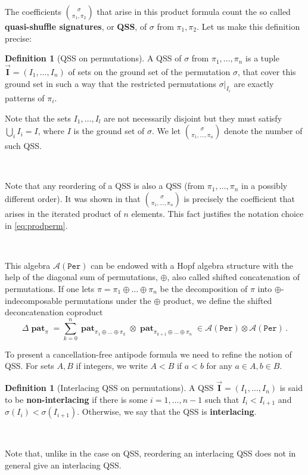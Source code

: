 \documentclass[12pt, reqno]{amsart}
\theoremstyle{definition}
\newtheorem{defin}[thm]{Definition}
\newcommand{\III}{\vec{\mathbf{I}}}
\DeclareMathOperator{\pat}{\mathbf{pat}}
\begin{document}
The coefficients $\binom{\sigma}{\pi_1, \pi_2}$ that arise in this product formula count the so called \textbf{quasi-shuffle signatures}, or \textbf{QSS}, of $\sigma$ from $\pi_1, \pi_2$.
Let us make this definition precise:

\begin{defin}[QSS on permutations]
A QSS of $\sigma$ from $\pi_1, \dots, \pi_n$ is a tuple $\III = (I_1, \dots, I_n)$ of sets on the ground set of the permutation $\sigma$, that cover this ground set in such a way that the restricted permutations $\sigma|_{I_i}$ are exactly patterns of $\pi_i$.

Note that the sets $I_1, \ldots, I_l$ are not necessarily disjoint but they must satisfy $\bigcup_i I_i = I$, where $I$ is the ground set of $\sigma $.
We let $\binom{\sigma}{\pi_1, \dots, \pi_n}$ denote the number of such QSS.

\

Note that any reordering of a QSS is also a QSS (from $\pi_1, \ldots, \pi_n$ in a possibly different order).
It was shown in \cite{Penaguiao2020} that $\binom{\sigma}{\pi_1, \dots, \pi_n}$ is precisely the coefficient that arises in the iterated product of $n$ elements.
This fact justifies the notation choice in \eqref{eq:prodperm}.
\end{defin}

\

This algebra $\mathcal A(\mathtt{Per})$ can be endowed with a Hopf algebra structure with the help of the diagonal sum of permutations, $\oplus$, also called shifted concatenation of permutations.
If one lets $\pi = \pi_1 \oplus \dots \oplus \pi_n$ be the decomposition of $\pi$ into $\oplus$-indecomposable permutations under the $\oplus$ product, we define the shifted deconcatenation coproduct
$$\Delta \pat_{\pi} = \sum_{k=0}^n \pat_{\pi_1\oplus \dots \oplus \pi_k} \otimes \pat_{\pi_{k+1}\oplus \dots \oplus \pi_n} \in \mathcal A (\mathtt{Per}) \otimes \mathcal A (\mathtt{Per})\, .$$

To present a cancellation-free antipode formula we need to refine the notion of QSS.
For sets $A, B$ if integers, we write $A <B$ if $a<b $ for any $a\in A, b \in B$.

\begin{defin}[Interlacing QSS on permutations]
A QSS $\III = (I_1, \dots, I_n)$ is said to be \textbf{non-interlacing} if there is some $i=1, \dots, n-1$ such that $I_i < I_{i+1}$ and $\sigma(I_i) < \sigma(I_{i+1})$.
Otherwise, we say that the QSS is \textbf{interlacing}. 

\

Note that, unlike in the case on QSS, reordering an interlacing QSS does not in general give an interlacing QSS.
\end{defin}
\end{document}
